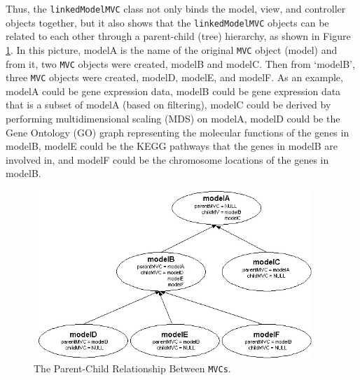 \documentclass[11pt]{article}
\newcommand{\Robject}[1]{{\texttt{#1}}}
\newcommand{\Rclass}[1]{\texttt{#1}}
\begin{document}

Thus, the \Rclass{linkedModelMVC} class not only binds the model,
view, and controller objects together, but it also shows
that the \Robject{linkedModelMVC} objects can be related to each other 
through a
parent-child (tree) hierarchy, as shown in Figure \ref{Fig:Hier}.  In this
picture, modelA is the name of the original \Robject{MVC} object
(model) and from it, two \Robject{MVC} objects were created,
modelB and modelC. Then from `modelB', three
\Robject{MVC} objects were created, modelD, modelE, and
modelF.  As an example, modelA could be gene 
expression data, modelB could be gene expression data that is a subset of
modelA (based on filtering), modelC could be derived by performing
multidimensional scaling (MDS) on modelA, modelD could be the Gene Ontology
(GO) graph representing the molecular functions of the genes in modelB,
modelE could be the KEGG pathways that the genes in modelB are involved
in, and modelF could be the chromosome locations of the genes in modelB.


\begin{figure}[ht]
  \begin{center}
    \includegraphics[height=2.5in, width=4.2in]{Hierarchy2.jpg}
    \caption{ The Parent-Child Relationship Between \Robject{MVCs}. }
    \label{Fig:Hier}
  \end{center}
\end{figure}
\end{document}
